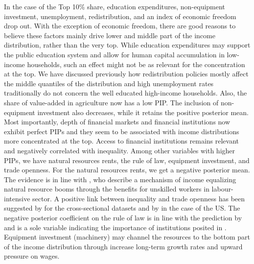\documentclass[preprint, nonatbib, 10pt]{elsarticle}
\begin{document}
In the case of the Top 10\% share, education expenditures, non-equipment investment, unemployment, redistribution, and an index of economic freedom drop out. With the exception of economic freedom, there are good reasons to believe these factors mainly drive lower and middle part of the income distribution, rather than the very top. While education expenditures may support the public education system and allow for human capital accumulation in low-income households, such an effect might not be as relevant for the concentration at the top. We have discussed previously how redistribution policies mostly affect the middle quantiles of the distribution and high unemployment rates traditionally do not concern the well educated high-income households. Also, the share of value-added in agriculture now has a low \ac{PIP}. The inclusion of non-equipment investment also decreases, while it retains the positive posterior mean. Most importantly, depth of financial markets and financial institutions now exhibit perfect \acp{PIP} and they seem to be associated with income distributions more concentrated at the top. Access to financial institutions remains relevant and negatively correlated with inequality. Among other variables with higher \acp{PIP}, we have natural resources rents, the rule of law, equipment investment, and trade openness. For the natural resources rents, we get a negative posterior mean. The evidence is in line with \textcite{goderismalone2011}, who describe a mechanism of income equalizing natural resource booms through the benefits for unskilled workers in labour-intensive sector. A positive link between inequality and trade openness has been suggested by \textcite{Jaumotte2013,dabla2015causes} for the cross-sectional datasets and by \textcite{milanovicvan2018inequality} in the case of the US. The negative posterior coefficient on the rule of law is in line with the prediction by \textcite{perotti2007investor} and is a sole variable indicating the importance of institutions posited in \textcite{acemoglu2003cross,acemoglu2015rise}. Equipment investment (machinery) may channel the resources to the bottom part of the income distribution through increase long-term growth rates and upward pressure on wages.
\end{document}
